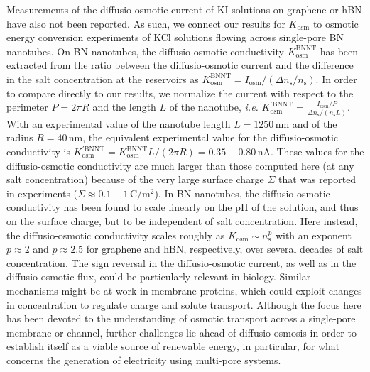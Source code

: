 \documentclass[journal=ancac3,manuscript=article,layout=twocolumn]{achemso}
\newcommand{\ns}{n_\text{s}}
\begin{document}
Measurements of the diffusio-osmotic current of KI solutions on graphene or hBN
have also not been reported. As such, we
connect our results for $K_\mathrm{osm}$
to osmotic energy conversion experiments of KCl solutions
flowing across single-pore BN
nanotubes\cite{Siria2013}.
On BN nanotubes, the diffusio-osmotic conductivity
$K^\mathrm{BNNT}_\mathrm{osm}$ has
been extracted from the ratio between the
diffusio-osmotic current and the difference in
the salt concentration at the reservoirs as
$K^\mathrm{BNNT}_\mathrm{osm} = I_\text{osm} /(\Delta \ns /\ns)$.
In order to compare directly to our results, we
normalize the current with respect to the perimeter
$P= 2\pi R$ and the length $L$ of the nanotube, \textit{i.e.}
$K^{\prime \mathrm{BNNT}}_\mathrm{osm} = \frac{I_\text{osm} /P}{\Delta \ns /( \ns L)}$. With an experimental value of the nanotube length   $L=1250$\,nm and of the radius $R=40$\,nm, the equivalent
experimental value for the diffusio-osmotic conductivity is
$K^{\prime \mathrm{BNNT}}_\mathrm{osm} = K^\mathrm{BNNT}_\mathrm{osm} L/(2\pi R) = 0.35 - 0.80$\,nA. These values for the diffusio-osmotic conductivity are much
larger than those computed here (at any salt concentration)
because of the very large surface charge $\Sigma$
that was reported in experiments ($\Sigma \approx 0.1 -1$\,C/m$^2$).
In BN nanotubes, the diffusio-osmotic
conductivity has been found to scale linearly on
the pH of the solution, and thus on the surface charge,
but to be independent of salt concentration\cite{Siria2013}.
Here instead, the diffusio-osmotic conductivity
scales roughly as $K_\mathrm{osm} \sim \ns^{p}$
with an exponent $p\approx 2$ and $p\approx2.5$
for graphene and hBN, respectively, over several decades
of salt concentration. The sign reversal in the
diffusio-osmotic current, as well as
in the diffusio-osmotic flux,
could be particularly relevant in biology.
Similar mechanisms might be at work in
membrane proteins, which could exploit changes
in concentration to regulate charge and solute
transport\cite{van2006claudins,van2003reversal}.
Although the focus here has been devoted to the understanding of
osmotic transport across a single-pore membrane or channel,
further challenges lie ahead of diffusio-osmosis in order to
establish itself as a viable source of renewable energy, in
particular, for what concerns the generation of electricity using
multi-pore systems.\cite{macha20192d,Tong2021,Wang2021}
\end{document}
